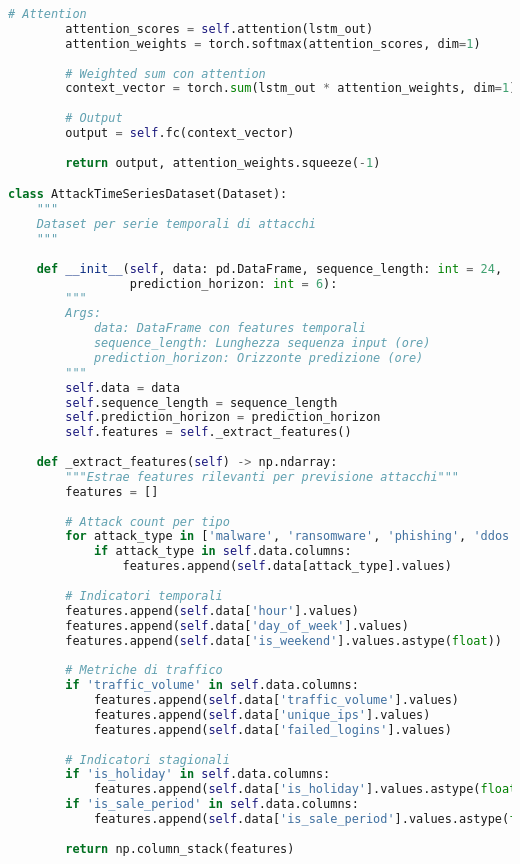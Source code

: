 \begin{lstlisting}[language=Python, caption=LSTM per Previsione Pattern di Attacco]
        # Attention
        attention_scores = self.attention(lstm_out)
        attention_weights = torch.softmax(attention_scores, dim=1)
        
        # Weighted sum con attention
        context_vector = torch.sum(lstm_out * attention_weights, dim=1)
        
        # Output
        output = self.fc(context_vector)
        
        return output, attention_weights.squeeze(-1)

class AttackTimeSeriesDataset(Dataset):
    """
    Dataset per serie temporali di attacchi
    """
    
    def __init__(self, data: pd.DataFrame, sequence_length: int = 24,
                 prediction_horizon: int = 6):
        """
        Args:
            data: DataFrame con features temporali
            sequence_length: Lunghezza sequenza input (ore)
            prediction_horizon: Orizzonte predizione (ore)
        """
        self.data = data
        self.sequence_length = sequence_length
        self.prediction_horizon = prediction_horizon
        self.features = self._extract_features()
        
    def _extract_features(self) -> np.ndarray:
        """Estrae features rilevanti per previsione attacchi"""
        features = []
        
        # Attack count per tipo
        for attack_type in ['malware', 'ransomware', 'phishing', 'ddos']:
            if attack_type in self.data.columns:
                features.append(self.data[attack_type].values)
        
        # Indicatori temporali
        features.append(self.data['hour'].values)
        features.append(self.data['day_of_week'].values)
        features.append(self.data['is_weekend'].values.astype(float))
        
        # Metriche di traffico
        if 'traffic_volume' in self.data.columns:
            features.append(self.data['traffic_volume'].values)
            features.append(self.data['unique_ips'].values)
            features.append(self.data['failed_logins'].values)
        
        # Indicatori stagionali
        if 'is_holiday' in self.data.columns:
            features.append(self.data['is_holiday'].values.astype(float))
        if 'is_sale_period' in self.data.columns:
            features.append(self.data['is_sale_period'].values.astype(float))
        
        return np.column_stack(features)
    

\end{lstlisting}
